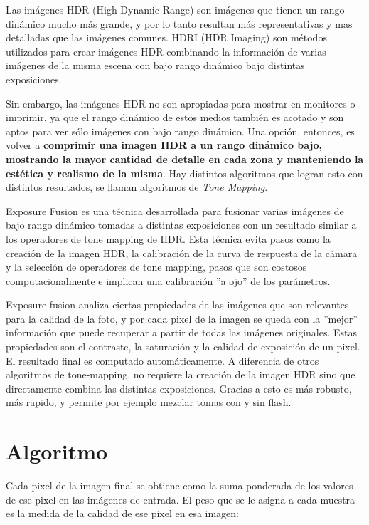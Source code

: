 \documentclass[a4paper,10pt]{article}
\begin{document}
        Las imágenes HDR (High Dynamic Range) son imágenes que tienen un rango dinámico mucho más grande, y por lo tanto resultan más representativas y mas detalladas que las imágenes comunes. HDRI (HDR Imaging) son métodos utilizados para crear imágenes HDR combinando la información de varias imágenes de la misma escena con bajo rango dinámico bajo distintas exposiciones.

        Sin embargo, las imágenes HDR no son apropiadas para mostrar en monitores o imprimir, ya que el rango dinámico de estos medios también es acotado y son aptos para ver sólo imágenes con bajo rango dinámico. Una opción, entonces, es volver a \textbf{comprimir una imagen HDR a un rango dinámico bajo, mostrando la mayor cantidad de detalle en cada zona y manteniendo la estética y realismo de la misma}. Hay distintos algoritmos que logran esto con distintos resultados, se llaman algoritmos de \emph{Tone Mapping}.

        Exposure Fusion \cite{DBLP:conf/pg/MertensKR07} es una técnica desarrollada para fusionar varias imágenes de bajo rango dinámico tomadas a distintas exposiciones  con un resultado similar a los operadores de tone mapping de HDR. Esta técnica evita pasos como la creación de la imagen HDR, la calibración de la curva de respuesta de la cámara y la selección de operadores de tone mapping, pasos que son costosos computacionalmente e implican una calibración ''a ojo'' de los parámetros.

        Exposure fusion analiza ciertas propiedades de las imágenes que son relevantes para la calidad de la foto, y por cada pixel de la imagen se queda con la ''mejor'' información que puede recuperar a partir de todas las imágenes originales. Estas propiedades son el contraste, la saturación y la calidad de exposición de un pixel. El resultado final es computado automáticamente. A diferencia de otros algoritmos de tone-mapping, no requiere la creación de la imagen HDR sino que directamente combina las distintas exposiciones. Gracias a esto es más robusto, más rapido, y permite por ejemplo mezclar tomas con y sin flash.

    \section{Algoritmo}

        Cada pixel de la imagen final se obtiene como la suma ponderada de los valores de ese pixel en las imágenes de entrada. El peso que se le asigna a cada muestra es la medida de la calidad de ese pixel en esa imagen:
\end{document}
